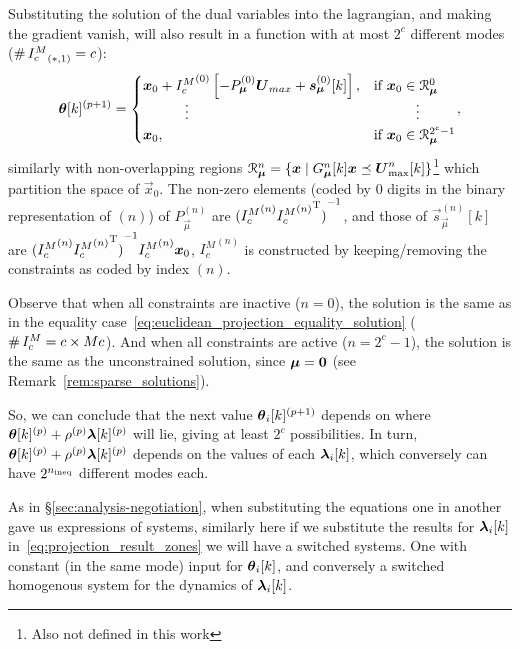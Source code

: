 \documentclass[../main.tex]{subfiles}
\begin{document}
Substituting the solution of the dual variables into the lagrangian, and making the gradient vanish, will also result in a \pwa{} function with at most $2^{c}$ different modes (${\card{\elem[*,1]{I_{c}^{M}}}=c}$):
\begin{equation}
  \label{eq:projection_result_zones}
  \begin{aligned}
    \vec{\theta}[k]\pplusone=
    \begin{cases}
      \vec{x}_{0}+
      {I_{c}^{M}}^{(0)}\left[-P_{\vec{\mu}}^{(0)}\vec{U}_{max}+\vec{s}_{\vec{\mu}}^{(0)}[k]\right],&\text{if}\ \vec{x}_{0}\in\set{R}_{\vec{\mu}}^{0}\\
      \qquad\quad \vdots&\qquad\quad \vdots\\
      \vec{x}_{0},&\text{if}\ \vec{x}_{0}\in\set{R}_{\vec{\mu}}^{2^{c}-1}\\
    \end{cases}
  \end{aligned},
\end{equation}
similarly with non-overlapping regions ${\set{R}_{\vec{\mu}}^{n}=\setbuild{\vec{x}}{G_{\vec{\mu}}^{n}[k]\vec{x} \preceq \vec{U}_{\max}^{n}[k]}}$\footnote{Also not defined in this work} which partition the space of $\vec{x}_{0}$.
The non-zero elements (coded by $0$ digits in the binary representation of $(n)$) of $P_{\vec{\mu}}^{(n)}$ are ${({I_{c}^{M}}^{(n)}{{I_{c}^{M}}^{(n)}}\T)}^{-1}$, and those of $\vec{s}_{\vec{\mu}}^{(n)}[k]$ are ${{({I_{c}^{M}}^{(n)}{{I_{c}^{M}}^{(n)}}\T)}^{-1}{I_{c}^{M}}^{(n)}\vec{x}_{0}}$, ${I_{c}^{M}}^{(n)}$ is constructed by keeping/removing the constraints as coded by index $(n)$.

Observe that when all constraints are inactive ($n=0$), the solution is the same as in the equality case~\eqref{eq:euclidean_projection_equality_solution} ($\card{I_{c}^{M}}=c\times Mc$).
And when all constraints are active ($n=2^{c}-1$), the solution is the same as the unconstrained solution, since $\vec{\mu}=\0$ (see Remark~\ref{rem:sparse_solutions}).

So, we can conclude that the next value $\thetaik\pplusone$ depends on where $\vec{\theta}[k]\p+\rho\p\vec{\lambda}[k]\p$ will lie, giving at least $2^{c}$ possibilities.
In turn, $\vec{\theta}[k]\p+\rho\p\vec{\lambda}[k]\p$ depends on the values of each $\lambdaik$, which conversely can have $2^{\nineq}$ different modes each.

As in \S\ref{sec:analysis-negotiation}, when substituting the equations one in another gave us expressions of \dt{} systems, similarly here if we substitute the results for $\lambdaik$ in~\eqref{eq:projection_result_zones} we will have a switched \dt{} systems.
One with constant (in the same mode) input for $\thetaik$, and conversely a switched homogenous system for the dynamics of $\lambdaik$.
\end{document}
